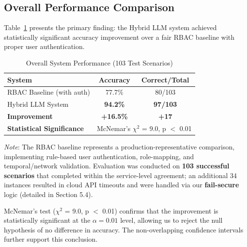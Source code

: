 \documentclass[conference]{IEEEtran}
\begin{document}
\subsection{Overall Performance Comparison}

Table~\ref{tab:overall} presents the primary finding: the Hybrid LLM system achieved statistically significant accuracy improvement over a fair RBAC baseline with proper user authentication.

\begin{table}[h]
    \caption{Overall System Performance (103 Test Scenarios)}
    \label{tab:overall}
    \begin{center}
        \begin{tabular}{lcc}
            \toprule
            \textbf{System}                   & \textbf{Accuracy}                                        & \textbf{Correct/Total} \\
            \midrule
            RBAC Baseline (with auth)         & 77.7\%                                                   & 80/103                 \\
            Hybrid LLM System                 & \textbf{94.2\%}                                          & \textbf{97/103}        \\
            \midrule
            \textbf{Improvement}              & \textbf{+16.5\%}                                         & \textbf{+17}           \\
            \textbf{Statistical Significance} & \multicolumn{2}{c}{McNemar's $\chi^2$ = 9.0, p $<$ 0.01}                          \\
            \bottomrule
        \end{tabular}
    \end{center}
\end{table}

\textit{Note}: The RBAC baseline represents a production-representative comparison, implementing rule-based user authentication, role-mapping, and temporal/network validation. Evaluation was conducted on \textbf{103 successful scenarios} that completed within the service-level agreement; an additional 34 instances resulted in cloud API timeouts and were handled via our \textbf{fail-secure} logic (detailed in Section 5.4).

McNemar's test ($\chi^2$ = 9.0, p $<$ 0.01) confirms that the improvement is statistically significant at the $\alpha = 0.01$ level, allowing us to reject the null hypothesis of no difference in accuracy. The non-overlapping confidence intervals further support this conclusion.
\end{document}
